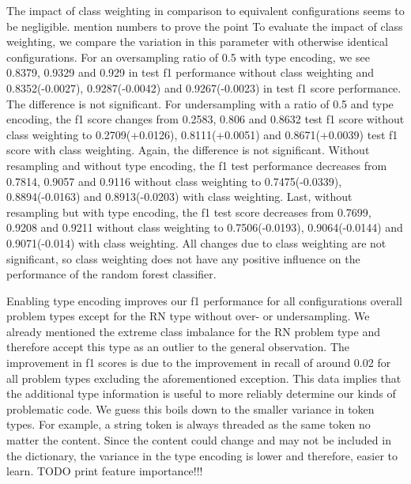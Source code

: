 The impact of class weighting in comparison to equivalent configurations seems to be negligible. 
mention numbers to prove the point
To evaluate the impact of class weighting, we compare the variation in this parameter with otherwise identical configurations.
For an oversampling ratio of 0.5 with type encoding, we see 0.8379, 0.9329 and 0.929 in test f1 performance without class weighting and 0.8352(-0.0027), 0.9287(-0.0042) and 0.9267(-0.0023) in test f1 score performance. The difference is not significant.
For undersampling with a ratio of 0.5 and type encoding, the f1 score changes from 0.2583, 0.806 and 0.8632 test f1 score without class weighting to 0.2709(+0.0126), 0.8111(+0.0051) and 0.8671(+0.0039) test f1 score with class weighting. Again, the difference is not significant.
Without resampling and without type encoding, the f1 test performance decreases from 0.7814, 0.9057 and 0.9116 without class weighting to 0.7475(-0.0339), 0.8894(-0.0163) and 0.8913(-0.0203) with class weighting.
Last, without resampling but with type encoding, the f1 test score decreases from 0.7699, 0.9208 and 0.9211 without class weighting to 0.7506(-0.0193), 0.9064(-0.0144) and 0.9071(-0.014) with class weighting.
All changes due to class weighting are not significant, so class weighting does not have any positive influence on the performance of the random forest classifier.

Enabling type encoding improves our f1 performance for all configurations overall problem types except for the RN type without over- or undersampling. We already mentioned the extreme class imbalance for the RN problem type and therefore accept this type as an outlier to the general observation. The improvement in f1 scores is due to the improvement in recall of around 0.02 for all problem types excluding the aforementioned exception. This data implies that the additional type information is useful to more reliably determine our kinds of problematic code. We guess this boils down to the smaller variance in token types. For example, a string token is always threaded as the same token no matter the content. Since the content could change and may not be included in the dictionary, the variance in the type encoding is lower and therefore, easier to learn. TODO print feature importance!!!

